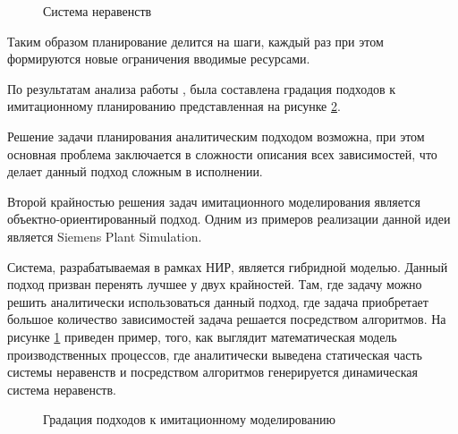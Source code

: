 \begin{figure}[H]
    \caption{Система неравенств}
    \label{ris:sys1}
\end{figure}

Таким образом планирование делится на шаги, каждый раз при этом формируются новые ограничения вводимые ресурсами.

По результатам анализа работы \cite{Jahangirian}, была составлена градация подходов к имитационному планированию представленная на рисунке \ref{ris:IM_detalApp}. 

Решение задачи планирования аналитическим подходом возможна, при этом основная проблема заключается в сложности описания всех зависимостей, что делает данный подход сложным в исполнении.

Второй крайностью решения задач имитационного моделирования является объектно-ориентированный подход. Одним из примеров реализации данной идеи является Siemens Plant Simulation.

Система, разрабатываемая в рамках НИР, является гибридной моделью. Данный подход призван перенять лучшее у двух крайностей. Там, где задачу можно решить аналитически использоваться данный подход, где задача приобретает большое количество зависимостей задача решается посредством алгоритмов. На рисунке \ref{ris:sys1} приведен пример, того, как выглядит математическая модель производственных процессов, где аналитически выведена статическая часть системы неравенств и посредством алгоритмов генерируется динамическая система неравенств.
\begin{figure}[H]
    \caption{Градация подходов к имитационному моделированию}
    \label{ris:IM_detalApp}
\end{figure}


